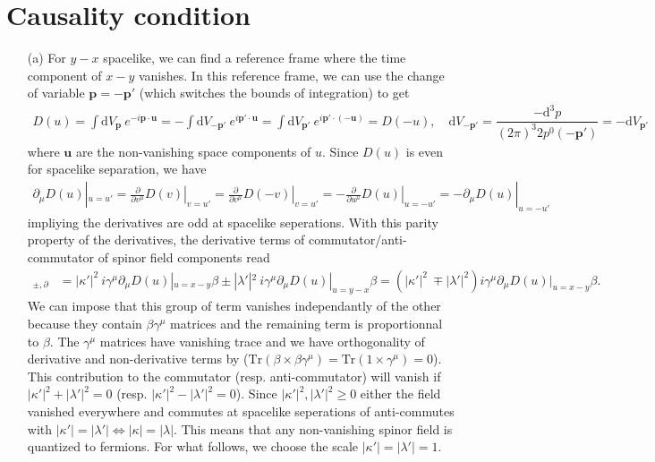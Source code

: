 \documentclass[10pt, a4paper]{article}
\begin{document}
\section{Causality condition}
\begin{enumerate}
  \item[(a)] For $y-x$ spacelike, we can find a reference frame where the time component of $x-y$ vanishes. In this reference frame, we can use the change of variable $\mathbf{p} = -\mathbf{p'}$ (which switches the bounds of integration) to get
  \begin{align*}
    D(u) = \int \text{d}V_\mathbf{p} \ e^{-i\mathbf{p} \cdot \mathbf{u}} = -\int \text{d}V_{-\mathbf{p'}} \ e^{i\mathbf{p'}\cdot \mathbf{u}}  = \int \text{d}V_{\mathbf{p'}} \ e^{i\mathbf{p'}\cdot (-\mathbf{u})} = D(-u), \quad \text{d}V_{-\mathbf{p'}} = \dfrac{-\text{d}^3 p}{(2\pi)^3 2p^0(-\mathbf{p'})} = -\text{d}V_{\mathbf{p'}}
  \end{align*}
  where $\mathbf{u}$ are the non-vanishing space components of $u$. Since $D(u)$ is even for spacelike separation, we have 
  \begin{align*}
   \partial_\mu D(u)|_{u=u'} = \left. \frac{\partial}{\partial v^\mu} D(v)\right|_{v = u'}  = \left. \frac{\partial}{\partial v^\mu} D(-v)\right|_{v=u'} =   \left. -\frac{\partial}{\partial u^\mu} D(u)\right|_{u=-u'} = -\partial_\mu D(u)|_{u=-u'}
  \end{align*}
  impliying the derivatives are odd at spacelike seperations. With this parity property of the derivatives, the derivative terms of commutator/anti-commutator of spinor field components read
  \begin{align*}
    [\psi_\ell(x), \psi_{\ell'}^\dagger(y)]_{\pm, \partial}
    &= |\kappa'|^2 \ i\gamma^\mu \partial_{\mu}  D(u)|_{u=x-y}\beta \pm |\lambda'|^2 \ i\gamma^\mu \partial_{\mu}  D(u)|_{u=y-x} \beta = \left(|\kappa'|^2 \ \mp |\lambda'|^2 \right) i\gamma^\mu \partial_{\mu}  D(u)|_{u=x-y} \beta.
  \end{align*}
  We can impose that this group of term vanishes independantly of the other because they contain $\beta \gamma^\mu$ matrices and the remaining term is proportionnal to $\beta$. The $\gamma^{\mu}$ matrices have vanishing trace and we have orthogonality of derivative and non-derivative terms by ($\text{Tr}(\beta \times \beta\gamma^{\mu}) = \text{Tr}(1 \times \gamma^{\mu})= 0$). This contribution to the commutator (resp. anti-commutator) will vanish if $|\kappa'|^2 + |\lambda'|^2  = 0$ (resp. $|\kappa'|^2 - |\lambda'|^2  = 0$). Since $|\kappa'|^2, |\lambda'|^2 \geq 0$ either the field vanished everywhere and commutes at spacelike seperations of anti-commutes with $|\kappa'| = |\lambda'| \iff |\kappa| = |\lambda|$. This means that any non-vanishing spinor field is quantized to fermions. For what follows, we choose the scale $|\kappa'| =  |\lambda'| = 1$.

\end{enumerate}
\end{document}
